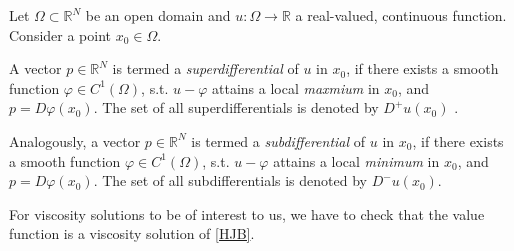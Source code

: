 	\begin{definition}
		Let $ \Omega \subset \mathbb{R}^N $ be an open domain and $ u : \Omega \to \mathbb{R} $ a real-valued, continuous function. Consider a point $ x_0 \in \Omega $. 
		
		A vector $ p \in \mathbb{R}^N $ is termed a \emph{superdifferential} of $ u $ in $ x_0 $, if there exists a smooth function $ \varphi \in C^{1}(\Omega) $, s.t. $ u - \varphi $ attains a local \emph{maxmium} in $ x_0 $, and $ p = D \varphi(x_0) $. The set of all superdifferentials is denoted by $ D^{+}u(x_0) $ .
		
		Analogously, a vector $ p \in \mathbb{R}^N $ is termed a \emph{subdifferential} of $ u $ in $ x_0 $, if there exists a smooth function $ \varphi \in C^{1}(\Omega) $, s.t. $ u - \varphi $ attains a local \emph{minimum} in $ x_0 $, and $ p = D \varphi(x_0) $. The set of all subdifferentials is denoted by $ D^{-}u(x_0) $.
	\end{definition}

	For viscosity solutions to be of interest to us, we have to check that the value function is a viscosity solution of \eqref{HJB}.
	

